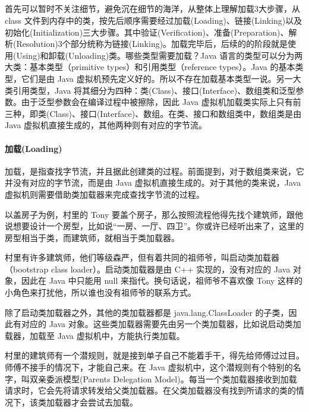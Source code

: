 \documentclass[../../../interview-questions.tex]{subfiles}
\begin{document}
\subsection{\color{red}{Java虚拟机如何加载类}}

首先可以暂时不关注细节，避免沉在细节的海洋，从整体上理解加载3大步骤，从 class 文件到内存中的类，按先后顺序需要经过加载(Loading)、链接(Linking)以及初始化(Initialization)三大步骤。其中验证(Verification)、准备(Preparation)、解析(Resolution)3个部分统称为链接(Linking)。加载完毕后，后续的的阶段就是使用(Using)和卸载(Unloading)类。哪些类型需要加载？Java 语言的类型可以分为两大类：基本类型（primitive types）和引用类型（reference types）。Java 的基本类型，它们是由 Java 虚拟机预先定义好的。所以不存在加载基本类型一说。另一大类引用类型，Java 将其细分为四种：类(Class)、接口(Interface)、数组类和泛型参数。由于泛型参数会在编译过程中被擦除，因此 Java 虚拟机加载类实际上只有前三种，即类(Class)、接口(Interface)、数组。在类、接口和数组类中，数组类是由 Java 虚拟机直接生成的，其他两种则有对应的字节流。

\paragraph{加载(Loading)}

加载，是指查找字节流，并且据此创建类的过程。前面提到，对于数组类来说，它并没有对应的字节流，而是由 Java 虚拟机直接生成的。对于其他的类来说，Java 虚拟机则需要借助类加载器来完成查找字节流的过程。

以盖房子为例，村里的 Tony 要盖个房子，那么按照流程他得先找个建筑师，跟他说想要设计一个房型，比如说“一房、一厅、四卫”。你或许已经听出来了，这里的房型相当于类，而建筑师，就相当于类加载器。

村里有许多建筑师，他们等级森严，但有着共同的祖师爷，叫启动类加载器（bootstrap class loader）。启动类加载器是由 C++ 实现的，没有对应的 Java 对象，因此在 Java 中只能用 null 来指代。换句话说，祖师爷不喜欢像 Tony 这样的小角色来打扰他，所以谁也没有祖师爷的联系方式。

除了启动类加载器之外，其他的类加载器都是 java.lang.ClassLoader 的子类，因此有对应的 Java 对象。这些类加载器需要先由另一个类加载器，比如说启动类加载器，加载至 Java 虚拟机中，方能执行类加载。

村里的建筑师有一个潜规则，就是接到单子自己不能着手干，得先给师傅过过目。师傅不接手的情况下，才能自己来。在 Java 虚拟机中，这个潜规则有个特别的名字，叫双亲委派模型(Parents Delegation Model)。每当一个类加载器接收到加载请求时，它会先将请求转发给父类加载器。在父类加载器没有找到所请求的类的情况下，该类加载器才会尝试去加载。
\end{document}
